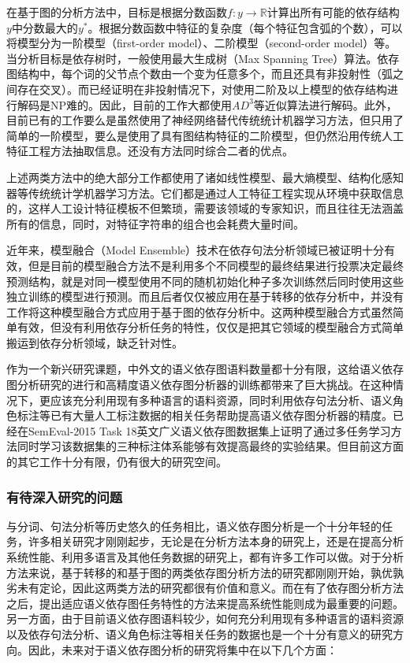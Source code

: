 在基于图的分析方法中，目标是根据分数函数$f:y\rightarrow \mathbb{R}$计算出所有可能的依存结构$y$中分数最大的$y^*$。根据分数函数中特征的复杂度（每个特征包含弧的个数），可以将模型分为一阶模型（first-order model）、二阶模型（second-order model）等。
当分析目标是依存树时，一般使用最大生成树（Max Spanning Tree）算法。依存图结构中，每个词的父节点个数由一个变为任意多个，而且还具有非投射性（弧之间存在交叉）。而已经证明在非投射情况下，对使用二阶及以上模型的依存结构进行解码是NP难的。因此，目前的工作大都使用$AD^3$等近似算法进行解码。此外，目前已有的工作要么是虽然使用了神经网络替代传统统计机器学习方法，但只用了简单的一阶模型，要么是使用了具有图结构特征的二阶模型，但仍然沿用传统人工特征工程方法抽取信息。还没有方法同时综合二者的优点。

上述两类方法中的绝大部分工作都使用了诸如线性模型、最大熵模型、结构化感知器等传统统计学机器学习方法。它们都是通过人工特征工程实现从环境中获取信息的，这样人工设计特征模板不但繁琐，需要该领域的专家知识，而且往往无法涵盖所有的信息，同时，对特征字符串的组合也会耗费大量时间。

近年来，模型融合（Model Ensemble）技术在依存句法分析领域已被证明十分有效，但是目前的模型融合方法不是利用多个不同模型的最终结果进行投票决定最终预测结构，就是对同一模型使用不同的随机初始化种子多次训练然后同时使用这些独立训练的模型进行预测。而且后者仅仅被应用在基于转移的依存分析中，并没有工作将这种模型融合方式应用于基于图的依存分析中。这两种模型融合方式虽然简单有效，但没有利用依存分析任务的特性，仅仅是把其它领域的模型融合方式简单搬运到依存分析领域，缺乏针对性。

作为一个新兴研究课题，中外文的语义依存图语料数量都十分有限，这给语义依存图分析研究的进行和高精度语义依存图分析器的训练都带来了巨大挑战。在这种情况下，更应该充分利用现有多种语言的语料资源，同时利用依存句法分析、语义角色标注等已有大量人工标注数据的相关任务帮助提高语义依存图分析器的精度。已经在SemEval-2015 Task 18英文广义语义依存图数据集上证明了通过多任务学习方法同时学习该数据集的三种标注体系能够有效提高最终的实验结果。但目前这方面的其它工作十分有限，仍有很大的研究空间。

\subsubsection{有待深入研究的问题}

与分词、句法分析等历史悠久的任务相比，语义依存图分析是一个十分年轻的任务，许多相关研究才刚刚起步，无论是在分析方法本身的研究上，还是在提高分析系统性能、利用多语言及其他任务数据的研究上，都有许多工作可以做。对于分析方法来说，基于转移的和基于图的两类依存图分析方法的研究都刚刚开始，孰优孰劣未有定论，因此这两类方法的研究都很有价值和意义。而在有了依存图分析方法之后，提出适应语义依存图任务特性的方法来提高系统性能则成为最重要的问题。另一方面，由于目前语义依存图语料较少，如何充分利用现有多种语言的语料资源以及依存句法分析、语义角色标注等相关任务的数据也是一个十分有意义的研究方向。因此，未来对于语义依存图分析的研究将集中在以下几个方面：

